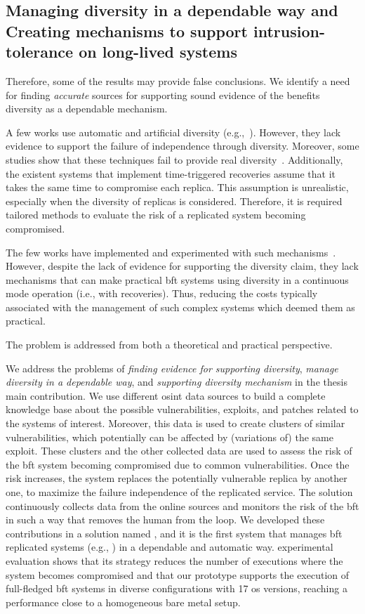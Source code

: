 \subsection*{Managing diversity in a dependable way and Creating mechanisms to support intrusion-tolerance on long-lived systems}
Therefore, some of the results may provide false conclusions.
We identify a need for finding \emph{accurate} sources for supporting sound evidence of the benefits diversity as a dependable mechanism.

A few works use automatic and artificial diversity (e.g.,~\cite{Roeder:2010,Amir:2011}). 
However, they lack evidence to support the failure of independence through diversity. 
Moreover, some studies show that these techniques fail to provide real diversity~\cite{Snow:2013,Bittau:2014}. 
Additionally, the existent systems that implement time-triggered recoveries assume that it takes the same time to compromise each replica. 
This assumption is unrealistic, especially when the diversity of replicas is considered. 
Therefore, it is required tailored methods to evaluate the risk of a replicated system becoming compromised.


The few works have implemented and experimented with such mechanisms~\cite{Rodrigues:2001,Roeder:2010,Amir:2011}. 
However, despite the lack of evidence for supporting the diversity claim, they lack mechanisms that can make practical \gls{bft} systems using diversity in a continuous mode operation (i.e., with recoveries).  
Thus, reducing the costs typically associated with the management of such complex systems which deemed them as practical.


The problem is addressed from both a theoretical and practical perspective.


We address the problems of \emph{finding evidence for supporting diversity}, \emph{manage diversity in a dependable way}, and \emph{supporting diversity mechanism} in the thesis main contribution.
We use different \gls{osint} data sources to build a complete knowledge base about the possible vulnerabilities, exploits, and patches related to the systems of interest. 
Moreover, this data is used to create clusters of similar vulnerabilities, which potentially can be affected by (variations of) the same exploit. 
These clusters and the other collected data are used to assess the risk of the \gls{bft} system becoming compromised due to common vulnerabilities.
Once the risk increases, the system replaces the potentially vulnerable replica by another one, to maximize the failure independence of the replicated service.
The solution continuously collects data from the online sources and monitors the risk of the \gls{bft} in such a way that removes the human from the loop.
We developed these contributions in a solution named \system, and it is the first system that manages \gls{bft} replicated systems (e.g., \sieveq) in a dependable and automatic way.
\system experimental evaluation shows that its strategy reduces the number of executions where the system becomes compromised and that our prototype supports the execution of full-fledged \gls{bft} systems in diverse configurations with 17 \gls{os} versions, reaching a performance close to a homogeneous bare metal setup. 


